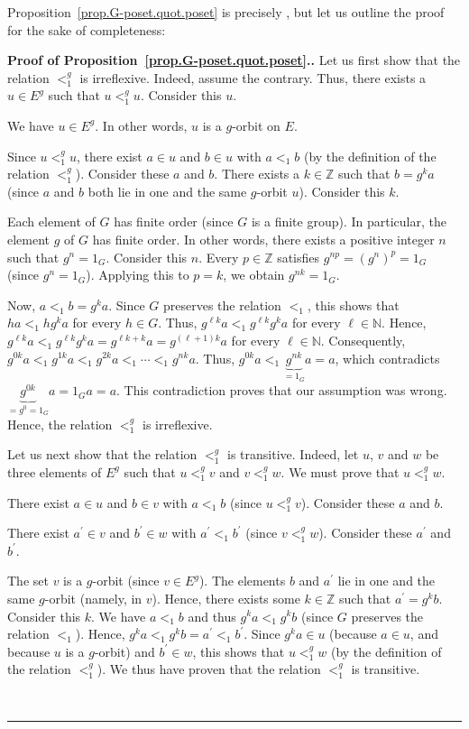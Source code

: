 \documentclass[numbers=enddot,12pt,final,onecolumn,notitlepage,abstracton]{scrartcl}%
\theoremstyle{definition}
\newenvironment{proof}[1][Proof]{\noindent\textbf{#1.} }{\ \rule{0.5em}{0.5em}}
\newcommand{\NN}{{\mathbb{N}}}
\newcommand{\ZZ}{{\mathbb{Z}}}
\begin{document}
Proposition~\ref{prop.G-poset.quot.poset} is precisely \cite[Lemma 2.4]{Joch},
but let us outline the proof for the sake of completeness:

\begin{proof}[Proof of Proposition~\ref{prop.G-poset.quot.poset}.]
Let us first show that the relation $<_{1}^{g}$ is irreflexive.
Indeed, assume the contrary. Thus, there exists a $u \in E^g$
such that $u <_1^g u$. Consider this $u$.

We have $u \in E^g$. In other words, $u$ is a $g$-orbit on $E$.

Since $u<_{1}^{g}u$, there exist $a\in u$ and $b\in u$ with
$a<_{1}b$ (by the definition of the relation $<_{1}^{g}$).
Consider these $a$ and $b$. There exists a $k\in\mathbb{Z}$ such
that $b=g^{k}a$ (since $a$ and $b$ both lie in one and the same $g$-orbit
$u$). Consider this $k$.

Each element of $G$ has finite order (since $G$ is a finite group).
In particular, the element $g$ of $G$ has finite order. In other words,
there exists a positive integer $n$ such that $g^{n}=1_G$.
Consider this $n$. Every $p \in \ZZ$ satisfies $g^{np}=\left(
g^{n}\right)  ^{p}=1_G$ (since $g^{n}=1_G$).
Applying this to $p=k$, we obtain $g^{nk}=1_G$.

Now, $a<_{1}b=g^{k}a$. Since $G$ preserves the relation $<_{1}$, this shows
that $ha<_{1}hg^{k}a$ for every $h\in G$.
Thus, $g^{\ell k}a<_{1}g^{\ell k}g^{k}a$ for every $\ell\in \NN $.
Hence,
$g^{\ell k} a <_{1} g^{\ell k} g^{k} a
= g^{\ell k + k} a = g^{\left(  \ell+1\right)  k} a$
for every $\ell\in \NN $.
Consequently, $g^{0k}a<_{1}g^{1k}a<_{1}g^{2k}a<_{1}\cdots<_{1}g^{nk}a$. Thus,
$g^{0k}a<_{1}\underbrace{g^{nk}}_{=1_G}a=a$, which
contradicts $\underbrace{g^{0k}}_{=g^0=1_G}a=1_Ga=a$.
This contradiction proves that our assumption was
wrong. Hence, the relation $<_{1}^{g}$ is irreflexive.

Let us next show that the relation $<_{1}^{g}$ is transitive. Indeed, let $u$,
$v$ and $w$ be three elements of $E^{g}$ such that $u<_{1}^{g}v$ and
$v<_{1}^{g}w$. We must prove that $u<_{1}^{g}w$.

There exist $a\in u$ and $b\in v$ with $a<_{1}b$ (since $u<_{1}^{g}v$).
Consider these $a$ and $b$.

There exist $a^{\prime}\in v$ and $b^{\prime}\in w$ with $a^{\prime}
<_{1}b^{\prime}$ (since $v<_{1}^{g}w$). Consider these $a^{\prime}$ and
$b^{\prime}$.

The set $v$ is a $g$-orbit (since $v \in E^g$).
The elements $b$ and $a^{\prime}$ lie in one and the same $g$-orbit (namely,
in $v$). Hence, there exists some $k\in\mathbb{Z}$ such that $a^{\prime}
=g^{k}b$. Consider this $k$. We have $a<_{1}b$ and thus $g^{k}a<_{1}g^{k}b$
(since $G$ preserves the relation $<_{1}$). Hence,
$g^{k}a<_{1}g^{k}b=a^{\prime}<_{1}b^{\prime}$.
Since $g^{k}a\in u$ (because $a\in u$, and because $u$ is a
$g$-orbit) and $b^{\prime}\in w$, this shows that $u<_{1}^{g}w$
(by the definition of the relation $<_{1}^{g}$).
We thus have proven that the
relation $<_{1}^{g}$ is transitive.


\end{proof}
\end{document}
